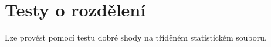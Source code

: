 

\section{Testy o rozdělení}

\begin{compactitem}
    \item Lze provést pomocí testu dobré shody na tříděném statistickém souboru.
\end{compactitem}


